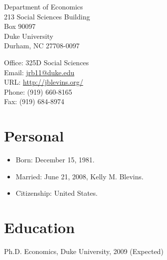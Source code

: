 \documentclass[overlapped,line,letterpaper]{res}
\begin{document}

\setlength{\leftmargini}{0em}
\renewcommand{\labelitemi}{}
\renewcommand{\labelitemii}{}

\renewcommand{\namefont}{\large\textbf}

\def\Cplusplus{C{\raise.5ex\hbox{\footnotesize ++ }}}



\begin{resume}

Department of Economics \\
213 Social Sciences Building \\
Box 90097 \\
Duke University \\
Durham, NC 27708-0097

Office: 325D Social Sciences \\
Email: \href{mailto:jrb11@duke.edu}{jrb11@duke.edu} \\
URL: \href{http://jblevins.org/}{http://jblevins.org/} \\
Phone: (919) 660-8165 \\
Fax: (919) 684-8974

\section{\bf Personal}

\begin{itemize}
  \item Born: December 15, 1981.
  \item Married: June 21, 2008, Kelly M. Blevins.
  \item Citizenship: United States.
\end{itemize}

\section{\bf Education}

Ph.D. Economics, Duke University, 2009 (Expected)


\end{resume}
\end{document}
